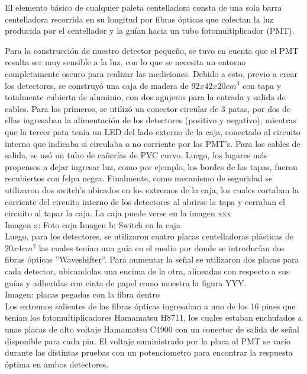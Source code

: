\documentclass[12pt,a4paper]{article}
\numberwithin{equation}{section}
\begin{document}
El elemento básico de cualquier paleta centelladora consta de una sola barra centelladora recorrida en
su longitud por fibras ópticas que colectan la luz producida por el centellador y la guían
hacia un tubo fotomultiplicador (PMT).

Para la construcción de nuestro detector pequeño, se tuvo en cuenta que el PMT resulta ser muy sensible a la luz, con lo que se necesita un entorno completamente oscuro para realizar las mediciones. Debido a esto, previo a crear los detectores, se construyó una caja de madera de  $ 92x42x20 cm^3 $ con tapa y totalmente cubierta de aluminio, con dos agujeros para la entrada y salida de cables. Para los primeros, se utilizó un conector circular de 3 patas, por dos de ellas ingresaban la alimentación de los detectores (positivo y negativo), mientras que la tercer pata tenía un LED del lado externo de la caja, conectado al circuito interno que indicaba si circulaba o no corriente por los PMT's. Para los cables de salida, se usó un tubo de cañerías de PVC curvo. Luego, los lugares más propensos a dejar ingresar luz, como por ejemplo, los bordes de las tapas, fueron recubiertos con felpa negra.
Finalmente, como mecanismo de seguridad se utilizaron dos switch's ubicados en los extremos de la caja, los cuales cortaban la corriente del circuito interno de los detectores al abrirse la tapa y cerraban el circuito al tapar la caja. La caja puede verse en la imagen xxx\\

Imagen a: Foto caja Imagen b: Switch en la caja\\

 
Luego, para los detectores, se utilizaron cuatro placas centelladoras plásticas de  $ 20x4 cm^2 $ las cuales tenían una guía en el medio por donde se introducían dos fibras ópticas ''Waveshifter''. Para aumentar la señal se utilizaron dos placas para cada detector, ubicandolas una encima de la otra, alineadas con respecto a sus guías y adheridas con cinta de papel como muestra la figura YYY.\\


Imagen: placas pegadas con la fibra dentro\\
 
Los extremos salientes de las fibras ópticas ingresaban a uno de los 16 pines que tenían los fotomultiplicadores Hamamatsu H8711, los cuales estaban enchufados a unas placas de alto voltaje Hamamatsu C4900 con un conector de salida de señal disponible para cada pin. El voltaje suministrado por la placa al PMT se varío durante las distintas pruebas con un potenciometro para encontrar la respuesta óptima en ambos detectores.
\end{document}

